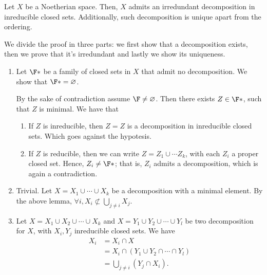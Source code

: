 \documentclass{subfiles}
\begin{document}
    \begin{theorem*}
        Let \(X\) be a Noetherian space. Then, \(X\) admits an irredundant decomposition 
            in inreducible closed sets. Additionally, such decomposition is unique 
            apart from the ordering.
    \end{theorem*}

    \begin{proof*}
        We divide the proof in three parts: we first show that a decomposition exists,
        then we prove that it's irredundant and lastly we show its uniqueness.

        \begin{enumerate}
            \item Let \(\F*\) be a family of closed sets in \(X\) that admit no decomposition.
                We show that \(\F* = \varnothing\).

                By the sake of contradiction assume \(\F \ne \varnothing\).
                Then there exists \(Z \in \F*\), such that \(Z\) is minimal.
                We have that
                \begin{enumerate}
                    \item If \(Z\) is inreducible, 
                        then \(Z = Z\) is a decomposition in inreducible closed sets. 
                        Which goes against the hypotesis.

                    \item If \(Z\) is reducible, then we can write \(Z = Z_{1} \cup \cdots Z_{k}\),
                        with each \(Z_{i}\) a proper closed set. Hence, \(Z_{i} \ne \F*\);
                        that is, \(Z_{i}\) admits a decomposition, which is again a contradiction.
                \end{enumerate}

            \item Trivial. Let \(X = X_{1} \cup \cdots \cup X_{k}\) be a decomposition with a minimal element.
                By the above lemma, \(\forall i, X_{i} \not\subset \bigcup_{j \ne i }X_{j}\).

            \item Let \(X = X_{1} \cup X_{2} \cup \cdots \cup X_{k}\) and 
                \(X = Y_{1} \cup Y_{2} \cup \cdots \cup Y_{l}\) be two decomposition for \(X\),
                with \(X_{i}, Y_{j}\) inreducible closed sets. 
                We have 
                \[\begin{aligned}
                    X_{i} &= X_{i} \cap X \\ 
                        &= X_{i} \cap (Y_{1} \cup Y_{2} \cap \cdots \cap Y_{l}) \\ 
                        &= \bigcup_{j \ne i} (Y_{j} \cap X_{i}).
                \end{aligned}\]


\end{enumerate}
\end{proof*}
\end{document}
